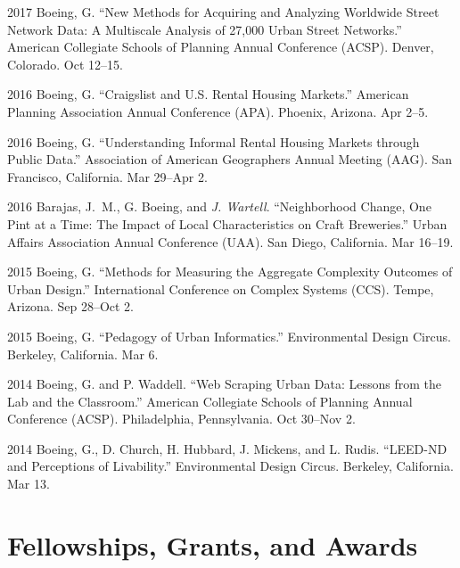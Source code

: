 \documentclass{academiccv}
\begin{document}
\begin{tablist}

\item[2017] \tab Boeing, G. \enquote{New Methods for Acquiring and Analyzing Worldwide Street Network Data: A Multiscale Analysis of 27,000 Urban Street Networks.} American Collegiate Schools of Planning Annual Conference (ACSP). Denver, Colorado. Oct 12--15.

\item[2016] \tab Boeing, G. \enquote{Craigslist and U.S. Rental Housing Markets.} American Planning Association Annual Conference (APA). Phoenix, Arizona. Apr 2--5.

\item[2016] \tab Boeing, G. \enquote{Understanding Informal Rental Housing Markets through Public Data.} Association of American Geographers Annual Meeting (AAG). San Francisco, California. Mar 29--Apr 2.

\item[2016] \tab Barajas, J.~M., G. Boeing, and \textit{J. Wartell}. \enquote{Neighborhood Change, One Pint at a Time: The Impact of Local Characteristics on Craft Breweries.} Urban Affairs Association Annual Conference (UAA). San Diego, California. Mar 16--19.

\item[2015] \tab Boeing, G. \enquote{Methods for Measuring the Aggregate Complexity Outcomes of Urban Design.} International Conference on Complex Systems (CCS). Tempe, Arizona. Sep 28--Oct 2.

\item[2015] \tab Boeing, G. \enquote{Pedagogy of Urban Informatics.} Environmental Design Circus. Berkeley, California. Mar 6.

\item[2014] \tab Boeing, G. and P. Waddell. \enquote{Web Scraping Urban Data: Lessons from the Lab and the Classroom.} American Collegiate Schools of Planning Annual Conference (ACSP). Philadelphia, Pennsylvania. Oct 30--Nov 2.

\item[2014] \tab Boeing, G., D. Church, H. Hubbard, J. Mickens, and L. Rudis. \enquote{LEED-ND and Perceptions of Livability.} Environmental Design Circus. Berkeley, California. Mar 13.

\end{tablist}



\section*{Fellowships, Grants, and Awards}
\end{document}
